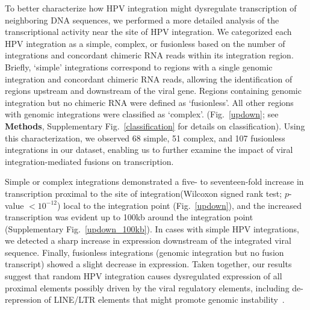\documentclass{bmcart}
\begin{document}
To better characterize how HPV integration might dysregulate
transcription of neighboring DNA sequences, we performed a more
detailed analysis of the transcriptional activity near the site of HPV
integration.  We categorized each HPV integration as a simple,
complex, or fusionless based on the number of integrations and
concordant chimeric RNA reads within its integration region.  Briefly,
`simple' integrations correspond to regions with a single genomic
integration and concordant chimeric RNA reads, allowing the
identification of regions upstream and downstream of the viral gene.
Regions containing genomic integration but no chimeric RNA were
defined as `fusionless'. All other regions with genomic integrations
were classified as `complex'.  (Fig.~\ref{updown}; see
\textbf{Methods}, Supplementary Fig.~\ref{classification} for details on
classification). Using this characterization, we observed 68 simple,
51 complex, and 107 fusionless integrations in our dataset, enabling
us to further examine the impact of viral integration-mediated fusions
on transcription.

Simple or complex integrations demonstrated a five- to seventeen-fold
increase in transcription proximal to the site of integration(Wilcoxon
signed rank test; $p$-value $<10^{-12}$) local to the integration point
(Fig.~\ref{updown}), and the increased transcription was evident up to
100kb around the integration point (Supplementary Fig.~\ref{updown_100kb}).  In
cases with simple HPV integrations, we detected a sharp increase in
expression downstream of the integrated viral sequence.  Finally,
fusionless integrations (genomic integration but no fusion transcript)
showed a slight decrease in expression. Taken together, our results
suggest that random HPV integration causes dysregulated expression of
all proximal elements possibly driven by the viral regulatory
elements, including de-repression of LINE/LTR elements that might
promote genomic
instability~\cite{Gasior2006,Romanish2010,Rodic2013,Xiao-Jie2016}.
\end{document}
